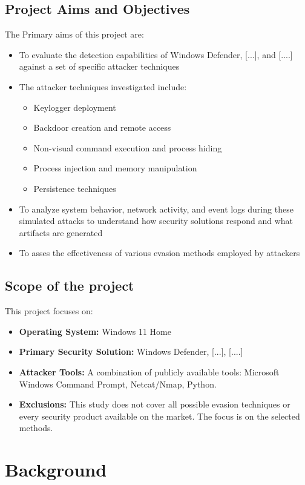 \documentclass[11pt]{article}
\begin{document}
		\subsection{Project Aims and Objectives}
		The Primary aims of this project are:
		\begin{itemize}
			\item To evaluate the detection capabilities of Windows Defender, [...], and [....] against a set of specific attacker techniques
			\item The attacker techniques investigated include:
				\begin{itemize}
					\item Keylogger deployment
					\item Backdoor creation and remote access
					\item Non-visual command execution and process hiding
					\item Process injection and memory manipulation
					\item Persistence techniques
				\end{itemize}
			\item To analyze system behavior, network activity, and event logs during these simulated attacks to understand how security solutions respond and what artifacts are generated
			\item To asses the effectiveness of various evasion methods employed by attackers
		\end{itemize}
		\subsection{Scope of the project}
		This project focuses on:
		\begin{itemize}
			\item \textbf{Operating System:} Windows 11 Home
			\item \textbf{Primary Security Solution:} Windows Defender, [...], [....]
			\item \textbf{Attacker Tools:} A combination of publicly available tools: Microsoft Windows Command Prompt, Netcat/Nmap, Python.
			\item \textbf{Exclusions:} This study does not cover all possible evasion techniques or every security product available on the market. The focus is on the selected methods.
		\end{itemize}
		
		
		
		
		
		\section{Background}
\end{document}
